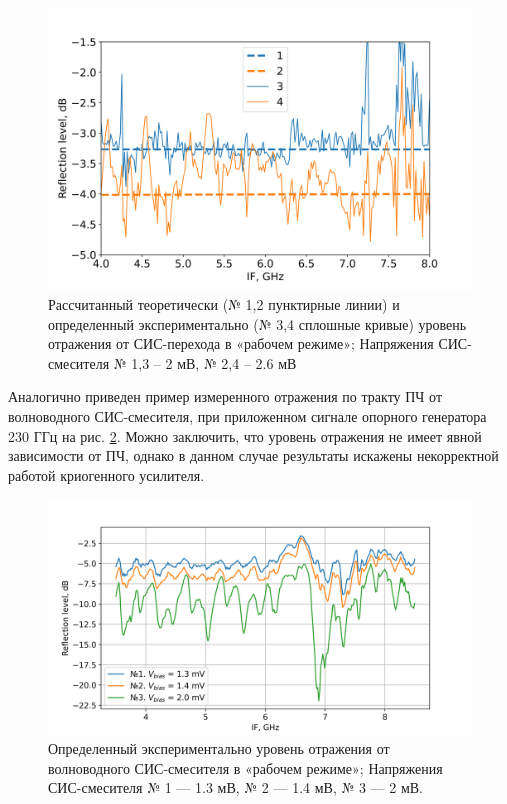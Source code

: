 \documentclass[a4paper]{article}
\begin{document}
\begin{figure}[H]
    \centering
    \includegraphics[scale=0.5]{refl_if.png}
    \caption{Рассчитанный теоретически (№ 1,2 пунктирные линии) и определенный экспериментально (№ 3,4 сплошные кривые) уровень отражения от СИС-перехода в «рабочем режиме»; Напряжения СИС-смесителя № 1,3 –  2 мВ, № 2,4 – 2.6 мВ}
    \label{pic-refl_if}
\end{figure}

Аналогично приведен пример измеренного отражения по тракту ПЧ от волноводного СИС-смесителя, при приложенном сигнале опорного генератора 230 ГГц на рис. \ref{fig:refl_new}. Можно заключить, что уровень отражения не имеет явной зависимости от ПЧ, однако в данном случае результаты искажены некорректной работой криогенного усилителя.

\begin{figure}[H]
    \centering
    \includegraphics[scale=0.5]{refl_new.png}
    \caption{Определенный экспериментально уровень отражения от волноводного СИС-смесителя в «рабочем режиме»; Напряжения СИС-смесителя № 1 — 1.3 мВ, № 2 — 1.4 мВ, № 3 — 2 мВ.}
    \label{fig:refl_new}
\end{figure}
\end{document}
